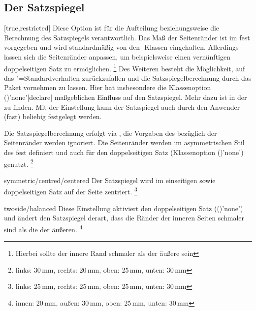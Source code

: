 \begin{Declaration*}{}
\begin{Declaration*}{}
\begin{Declaration*}{}
\subsection{Der Satzspiegel}
%
%
\begin{Declaration}[%
  v2.03;
  v2.05!\Option{cdgeometry=restricted};%
  v2.05!\Option{cdgeometry=adapted};%
  v2.05!\Option{cdgeometry=calculated};%
  v2.05!\Option{cdgeometry=custom};%
]{}[true,restricted]%
\printdeclarationlist%
%
%
%
Diese Option ist für die Aufteilung beziehungsweise die Berechnung des 
Satzspiegels verantwortlich. Das Maß der Seitenränder ist im \CD fest 
vorgegeben und wird standardmäßig von den \TUDScript-Klassen eingehalten. 
Allerdings lassen sich die Seitenränder anpassen, um beispielsweise einen 
vernünftigen doppelseitigen Satz zu ermöglichen.%
\footnote{Hierbei sollte der innere Rand schmaler als der äußere sein}
Des Weiteren besteht die Möglichkeit, auf das \KOMAScript"=Standardverhalten 
zurückzufallen und die Satzspiegelberechnung durch das Paket  
vornehmen zu lassen. Hier hat insbesondere die Klassenoption 
()'none'|declare| maßgeblichen Einfluss auf 
den Satzspiegel. Mehr dazu ist in der  
zu finden.
Mit der Einstellung  kann der Satzspiegel auch durch 
den Anwender (fast) beliebig festgelegt werden.
%
\begin{values}{}
\itemfalse
  Die Satzspiegelberechnung erfolgt via , die Vorgaben des 
  \CDs bezüglich der Seitenränder werden ignoriert.
\itemtrue*[asymmetric/cd]
  Die Seitenränder werden im asymmetrischen Stil des \CDs fest definiert und 
  auch für den doppelseitigen Satz
  (Klassenoption ()'none') genutzt.%
  \footnote{links: 30\,mm, rechts: 20\,mm, oben: 25\,mm, unten: 30\,mm}
\item[symmetric/centred/centered]
  Der Satzspiegel wird im einseitigen sowie doppelseitigen Satz auf der Seite 
  zentriert.%
  \footnote{links: 25\,mm, rechts: 25\,mm, oben: 25\,mm, unten: 30\,mm}
\item[twoside/balanced]
  Diese Einstellung aktiviert den doppelseitigen Satz 
  (()'none') und ändert den Satzspiegel 
  derart, dass die Ränder der inneren Seiten schmaler sind als die der äußeren.%
  \footnote{innen: 20\,mm, außen: 30\,mm, oben: 25\,mm, unten: 30\,mm}

\end{values}
\end{Declaration}
\end{Declaration*}
\end{Declaration*}
\end{Declaration*}
